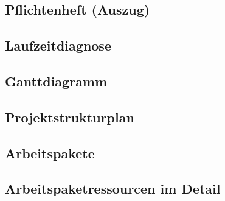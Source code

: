 \documentclass[11pt,toc=sectionentrywithoutdots, headheight=44pt, headings=optiontoheadandtoc, hyperfootnotes=false]{scrartcl}
\begin{document}
\subsection{Pflichtenheft (Auszug)}
\blindtext

\subsection{Laufzeitdiagnose}
\blindtext

\subsection{Ganttdiagramm}
\blindtext

\subsection{Projektstrukturplan}
\blindtext

\subsection{Arbeitspakete}
\blindtext

\subsection{Arbeitspaketressourcen im Detail}
\blindtext
\end{document}
